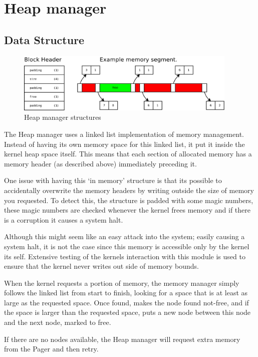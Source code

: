 \documentclass[a4paper]{report}
\begin{document}
\clearpage

\section{Heap manager}

\subsection{Data Structure}

\begin{figure}[ht]
\centering
\includegraphics[width=400px]{images/Heap_Manager}
\caption{Heap manager structures}
\label{fig:WinTitleBarScreen}
\end{figure}

The Heap manager uses a linked list implementation of memory management. Instead of having its own memory space for this linked list, it put it inside the kernel heap space itself. This means that each section of allocated memory has a memory header (as described above) immediately preceding it.

One issue with having this `in memory' structure is that its possible to accidentally overwrite the memory headers by writing outside the size of memory you requested. To detect this, the structure is padded with some magic numbers, these magic numbers are checked whenever the kernel frees memory and if there is a corruption it causes a system halt.

Although this might seem like an easy attack into the system; easily causing a system halt, it is not the case since this memory is accessible only by the kernel its self. Extensive testing of the kernels interaction with this module is used to ensure that the kernel never writes out side of memory bounds.

When the kernel requests a portion of memory, the memory manager simply follows the linked list from start to finish, looking for a space that is at least as large as the requested space. Once found, makes the node found not-free, and if the space is larger than the requested space, puts a new node between this node and the next node, marked to free.

If there are no nodes available, the Heap manager will request extra memory from the Pager and then retry.
\end{document}
